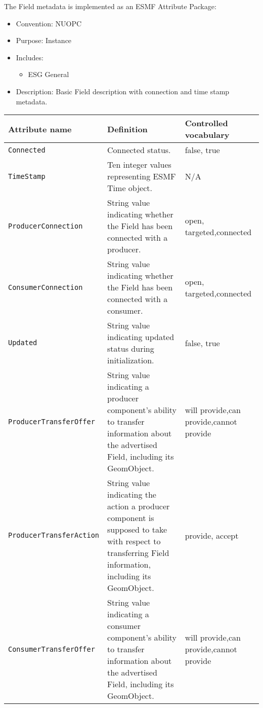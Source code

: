 \label{FieldMeta}
The Field metadata is implemented as an ESMF Attribute Package:

\begin{itemize}
    \item Convention: NUOPC
    \item Purpose: Instance
    \item Includes:
    \begin{itemize}
        \item ESG General
    \end{itemize} 
    \item Description: Basic Field description with connection and time stamp metadata. 
\end{itemize}

\begin{longtable}{|p{}|p{}|p{}|}
     \hline\hline
     {\bf Attribute name} & {\bf Definition} & {\bf Controlled vocabulary}\\
     \hline\hline
     {\tt Connected} & Connected status.& false, true\\ \hline
     {\tt TimeStamp} & Ten integer values representing ESMF Time object.& N/A\\ \hline
     {\tt ProducerConnection} & String value indicating whether the Field has been connected with a producer. & open, targeted,\newline connected\\ \hline
     {\tt ConsumerConnection} & String value indicating whether the Field has been connected with a consumer.& open, targeted,\newline connected\\ \hline
     {\tt Updated} & String value indicating updated status during initialization.& false, true\\ \hline
     {\tt ProducerTransferOffer} & String value indicating a producer component's ability to transfer information about the advertised Field, including its GeomObject.& will provide,\newline can provide,\newline cannot provide\\ \hline
     {\tt ProducerTransferAction} & String value indicating the action a producer component is supposed to take with respect to transferring Field information, including its GeomObject.& provide, accept\\ \hline
     {\tt ConsumerTransferOffer} & String value indicating a consumer component's ability to transfer information about the advertised Field, including its GeomObject.& will provide,\newline can provide,\newline cannot provide\\ \hline

\end{longtable}

